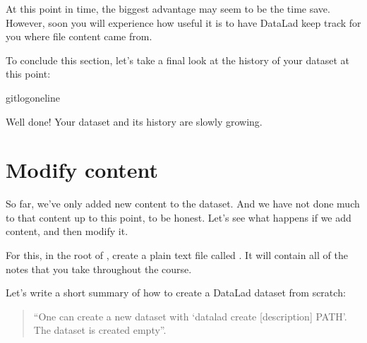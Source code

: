 \sphinxAtStartPar
At this point in time, the biggest advantage may seem to be the time save. However,
soon you will experience how useful it is to have DataLad keep track for you where
file content came from.

\sphinxAtStartPar
To conclude this section, let’s take a final look at the history of your dataset at
this point:

\begin{sphinxVerbatim}[commandchars=\\\{\}]
gitlog\PYGZhy{}\PYGZhy{}oneline
\end{sphinxVerbatim}

\sphinxAtStartPar
Well done! Your  dataset and its history are slowly growing.

\sphinxstepscope

\ignorespaces 

\section{Modify content}
\label{\detokenize{basics/101-103-modify:modify-content}}\label{\detokenize{basics/101-103-modify:modify}}\label{\detokenize{basics/101-103-modify:index-0}}\label{\detokenize{basics/101-103-modify::doc}}
\sphinxAtStartPar
So far, we’ve only added new content to the dataset. And we have not done
much to that content up to this point, to be honest. Let’s see what happens if
we add content, and then modify it.

\sphinxAtStartPar
For this, in the root of , create a plain text file
called . It will contain all of the notes that you take
throughout the course.

\sphinxAtStartPar
Let’s write a short summary of how to create a DataLad dataset from scratch:
\begin{quote}

\sphinxAtStartPar
“One can create a new dataset with ‘datalad create
{[}\textendash{}description{]} PATH’. The dataset is created empty”.
\end{quote}


